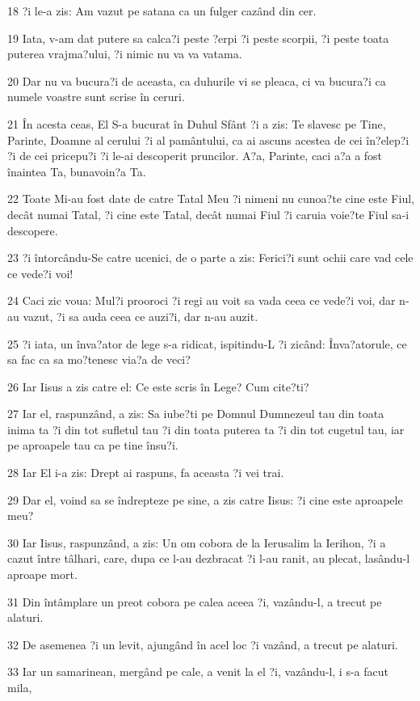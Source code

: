 \par 18 ?i le-a zis: Am vazut pe satana ca un fulger cazând din cer.
\par 19 Iata, v-am dat putere sa calca?i peste ?erpi ?i peste scorpii, ?i peste toata puterea vrajma?ului, ?i nimic nu va va vatama.
\par 20 Dar nu va bucura?i de aceasta, ca duhurile vi se pleaca, ci va bucura?i ca numele voastre sunt scrise în ceruri.
\par 21 În acesta ceas, El S-a bucurat în Duhul Sfânt ?i a zis: Te slavesc pe Tine, Parinte, Doamne al cerului ?i al pamântului, ca ai ascuns acestea de cei în?elep?i ?i de cei pricepu?i ?i le-ai descoperit pruncilor. A?a, Parinte, caci a?a a fost înaintea Ta, bunavoin?a Ta.
\par 22 Toate Mi-au fost date de catre Tatal Meu ?i nimeni nu cunoa?te cine este Fiul, decât numai Tatal, ?i cine este Tatal, decât numai Fiul ?i caruia voie?te Fiul sa-i descopere.
\par 23 ?i întorcându-Se catre ucenici, de o parte a zis: Ferici?i sunt ochii care vad cele ce vede?i voi!
\par 24 Caci zic voua: Mul?i prooroci ?i regi au voit sa vada ceea ce vede?i voi, dar n-au vazut, ?i sa auda ceea ce auzi?i, dar n-au auzit.
\par 25 ?i iata, un înva?ator de lege s-a ridicat, ispitindu-L ?i zicând: Înva?atorule, ce sa fac ca sa mo?tenesc via?a de veci?
\par 26 Iar Iisus a zis catre el: Ce este scris în Lege? Cum cite?ti?
\par 27 Iar el, raspunzând, a zis: Sa iube?ti pe Domnul Dumnezeul tau din toata inima ta ?i din tot sufletul tau ?i din toata puterea ta ?i din tot cugetul tau, iar pe aproapele tau ca pe tine însu?i.
\par 28 Iar El i-a zis: Drept ai raspuns, fa aceasta ?i vei trai.
\par 29 Dar el, voind sa se îndrepteze pe sine, a zis catre Iisus: ?i cine este aproapele meu?
\par 30 Iar Iisus, raspunzând, a zis: Un om cobora de la Ierusalim la Ierihon, ?i a cazut între tâlhari, care, dupa ce l-au dezbracat ?i l-au ranit, au plecat, lasându-l aproape mort.
\par 31 Din întâmplare un preot cobora pe calea aceea ?i, vazându-l, a trecut pe alaturi.
\par 32 De asemenea ?i un levit, ajungând în acel loc ?i vazând, a trecut pe alaturi.
\par 33 Iar un samarinean, mergând pe cale, a venit la el ?i, vazându-l, i s-a facut mila,
